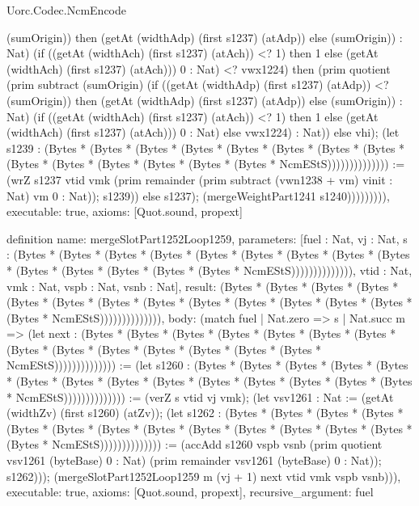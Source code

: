 \begin{lexlean}{Uorc.Codec.NcmEncode}
\begin{semanticmodule}
{(sumOrigin)) then (getAt (widthAdp) (first s1237) (atAdp)) else (sumOrigin)) : Nat) (if ((getAt (widthAch) (first s1237) (atAch)) <? 1) then 1 else (getAt (widthAch) (first s1237) (atAch))) 0 : Nat) <? vwx1224) then (prim quotient (prim subtract (sumOrigin) (if ((getAt (widthAdp) (first s1237) (atAdp)) <? (sumOrigin)) then (getAt (widthAdp) (first s1237) (atAdp)) else (sumOrigin)) : Nat) (if ((getAt (widthAch) (first s1237) (atAch)) <? 1) then 1 else (getAt (widthAch) (first s1237) (atAch))) 0 : Nat) else vwx1224) : Nat)) else vhi); (let s1239 : (Bytes * (Bytes * (Bytes * (Bytes * (Bytes * (Bytes * (Bytes * (Bytes * (Bytes * (Bytes * (Bytes * (Bytes * (Bytes * (Bytes * NcmEStS)))))))))))))) := (wrZ s1237 vtid vmk (prim remainder (prim subtract (vwn1238 + vm) vinit : Nat) vm 0 : Nat)); s1239)) else s1237); (mergeWeightPart1241 s1240))))))))),
  executable: true,
  axioms: [Quot.sound, propext]
}

definition{
  name: mergeSlotPart1252Loop1259,
  parameters: [fuel : Nat, vj : Nat, s : (Bytes * (Bytes * (Bytes * (Bytes * (Bytes * (Bytes * (Bytes * (Bytes * (Bytes * (Bytes * (Bytes * (Bytes * (Bytes * (Bytes * NcmEStS)))))))))))))), vtid : Nat, vmk : Nat, vspb : Nat, vsnb : Nat],
  result: (Bytes * (Bytes * (Bytes * (Bytes * (Bytes * (Bytes * (Bytes * (Bytes * (Bytes * (Bytes * (Bytes * (Bytes * (Bytes * (Bytes * NcmEStS)))))))))))))),
  body: (match fuel
    | Nat.zero => s
    | Nat.succ m => (let next : (Bytes * (Bytes * (Bytes * (Bytes * (Bytes * (Bytes * (Bytes * (Bytes * (Bytes * (Bytes * (Bytes * (Bytes * (Bytes * (Bytes * NcmEStS)))))))))))))) := (let s1260 : (Bytes * (Bytes * (Bytes * (Bytes * (Bytes * (Bytes * (Bytes * (Bytes * (Bytes * (Bytes * (Bytes * (Bytes * (Bytes * (Bytes * NcmEStS)))))))))))))) := (verZ s vtid vj vmk); (let vsv1261 : Nat := (getAt (widthZv) (first s1260) (atZv)); (let s1262 : (Bytes * (Bytes * (Bytes * (Bytes * (Bytes * (Bytes * (Bytes * (Bytes * (Bytes * (Bytes * (Bytes * (Bytes * (Bytes * (Bytes * NcmEStS)))))))))))))) := (accAdd s1260 vspb vsnb (prim quotient vsv1261 (byteBase) 0 : Nat) (prim remainder vsv1261 (byteBase) 0 : Nat)); s1262))); (mergeSlotPart1252Loop1259 m (vj + 1) next vtid vmk vspb vsnb))),
  executable: true,
  axioms: [Quot.sound, propext],
  recursive_argument: fuel
}


\end{semanticmodule}
\end{lexlean}
